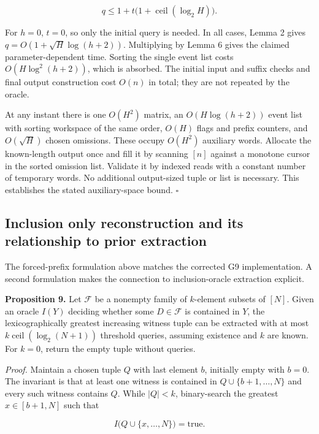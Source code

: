 \documentclass[
  11pt,
  letterpaper,
]{article}
\begin{document}
\[q\leq1+t\bigl(1+\operatorname{ceil}(\log_2 H)\bigr).\]

For \(h=0\), \(t=0\), so only the initial query is needed. In all cases,
Lemma 2 gives \(q=O(1+\sqrt H\log(h+2))\). Multiplying by Lemma 6 gives
the claimed parameter-dependent time. Sorting the single event list
costs \(O(H\log^2(h+2))\), which is absorbed. The initial input and
suffix checks and final output construction cost \(O(n)\) in total; they
are not repeated by the oracle.

At any instant there is one \(O(H^2)\) matrix, an \(O(H\log(h+2))\)
event list with sorting workspace of the same order, \(O(H)\) flags and
prefix counters, and \(O(\sqrt H)\) chosen omissions. These occupy
\(O(H^2)\) auxiliary words. Allocate the known-length output once and
fill it by scanning \([n]\) against a monotone cursor in the sorted
omission list. Validate it by indexed reads with a constant number of
temporary words. No additional output-sized tuple or list is necessary.
This establishes the stated auxiliary-space bound. \(\square\)

\hypertarget{inclusion-only-reconstruction-and-its-relationship-to-prior-extraction}{%
\subsection{Inclusion only reconstruction and its relationship to prior
extraction}\label{inclusion-only-reconstruction-and-its-relationship-to-prior-extraction}}

The forced-prefix formulation above matches the corrected G9
implementation. A second formulation makes the connection to
inclusion-oracle extraction explicit.

\textbf{Proposition 9.} Let \(\mathcal F\) be a nonempty family of
\(k\)-element subsets of \([N]\). Given an oracle \(I(Y)\) deciding
whether some \(D\in\mathcal F\) is contained in \(Y\), the
lexicographically greatest increasing witness tuple can be extracted
with at most \(k\operatorname{ceil}(\log_2(N+1))\) threshold queries,
assuming existence and \(k\) are known. For \(k=0\), return the empty
tuple without queries.

\emph{Proof.} Maintain a chosen tuple \(Q\) with last element \(b\),
initially empty with \(b=0\). The invariant is that at least one witness
is contained in \(Q\cup\{b+1,\ldots,N\}\) and every such witness
contains \(Q\). While \(|Q|<k\), binary-search the greatest
\(x\in[b+1,N]\) such that

\[I\bigl(Q\cup\{x,\ldots,N\}\bigr)=\mathrm{true}.\]
\end{document}
